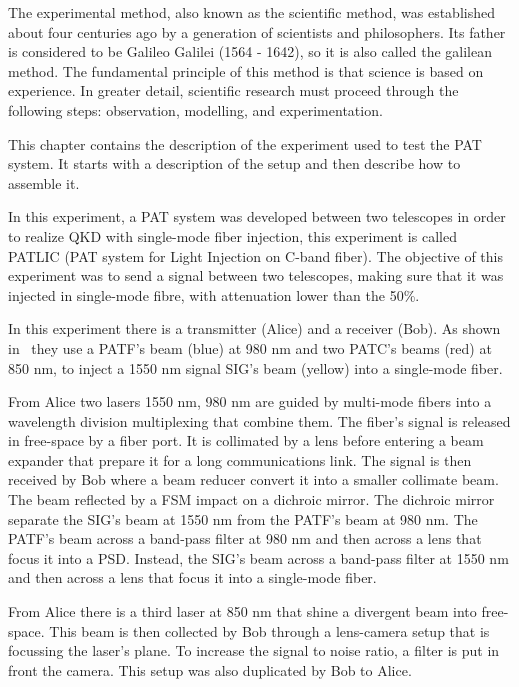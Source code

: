 The experimental method, also known as the scientific method, was established about four centuries ago by a generation of scientists and philosophers. Its father is considered to be Galileo Galilei (1564 - 1642), so it is also called the galilean method.
The fundamental principle of this method is that science is based on experience.
In greater detail, scientific research must proceed through the following steps: observation, modelling, and experimentation.

This chapter contains the description of the experiment used to test the PAT system. It starts with a description of the setup and then describe how to assemble it.


In this experiment, a PAT system was developed between two telescopes in order to realize QKD with single-mode fiber injection, this experiment is called PATLIC (PAT system for Light Injection on C-band fiber).
The objective of this experiment was to send a signal between two telescopes, making sure that it was injected in single-mode fibre, with attenuation lower than the 50\%.

In this experiment there is a transmitter (Alice) and a receiver (Bob). As shown in~ they use a PATF's beam (blue) at 980 nm and two PATC's beams (red) at 850 nm, to inject a 1550 nm signal SIG's beam (yellow) into a single-mode fiber.

From Alice two lasers 1550 nm, 980 nm are guided by multi-mode fibers into a wavelength division multiplexing that combine them. The fiber's signal is released in free-space by a fiber port. It is collimated by a lens before entering a beam expander that prepare it for a long communications link. The signal is then received by Bob where a beam reducer convert it into a smaller collimate beam. The beam reflected by a FSM impact on a dichroic mirror. The dichroic mirror separate the SIG's beam at 1550 nm from the PATF's beam at 980 nm. The PATF's beam across a band-pass filter at 980 nm and then across a lens that focus it into a PSD. Instead, the SIG's beam across a band-pass filter at 1550 nm and then across a lens that focus it into a single-mode fiber.

From Alice there is a third laser at 850 nm that shine a divergent beam into free-space. This beam is then collected by Bob through a lens-camera setup that is focussing the laser's plane. To increase the signal to noise ratio, a filter is put in front the camera. This setup was also duplicated by Bob to Alice.

